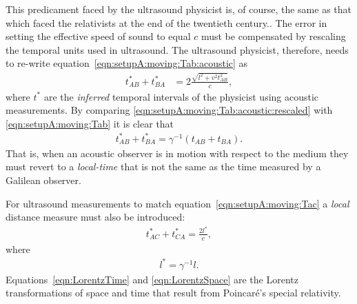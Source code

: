 \documentclass[10pt, fleqn,final,showtrims,oldfontcommands]{article} %
\newcommand{\eqnref}[1]{\ref{eqn:#1}}
\newcommand{\lr}[1]{\left( #1 \right)}
\newcommand{\Poincare}{Poincar{\'e}}
\begin{document}
This predicament faced by the ultrasound physicist  is, of course, the same as that which faced the relativists at the end of the twentieth century..
The error in setting the effective speed of sound to equal $c$  must be compensated by rescaling the temporal units used in ultrasound.
The ultrasound physicist, therefore,  needs to re-write equation~\ref{eqn:setupA:moving:Tab:acoustic} as
\begin{align}
 t_{AB}^\ast+t_{BA}^\ast  &= 2\frac{\sqrt{l^2+v^2t_{AB}^2}}{c},\label{eqn:setupA:moving:Tab:acoustic:rescaled}
\end{align}
where $t^\ast$ are the {\em inferred} temporal intervals of the physicist using acoustic measurements.
By comparing \eqnref{setupA:moving:Tab:acoustic:rescaled} with \eqnref{setupA:moving:Tab} it is clear that
\begin{align}
 t_{AB}^\ast+t_{BA}^\ast = \gamma^{-1}\lr{t_{AB}+t_{BA}}.\label{eqn:LorentzTime}
\end{align}
That is, when an acoustic observer is in motion with respect to the medium 
they must revert to a {\em local-time} that is not the same as the time measured by a Galilean observer.

For  ultrasound measurements to match equation~\ref{eqn:setupA:moving:Tac} 
a {\em local} distance measure must also be introduced: %
\begin{align}
  t_{AC}^\ast+t_{CA}^\ast = \frac{2l^\ast}{c},
\end{align}
where 
\begin{align}
l^\ast = \gamma^{-1} l.\label{eqn:LorentzSpace}
\end{align}
Equations~\ref{eqn:LorentzTime} and \ref{eqn:LorentzSpace} are the Lorentz transformations of space and time that result from \Poincare's special relativity.
\end{document}

